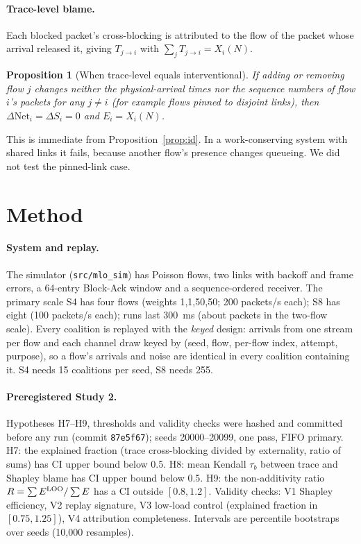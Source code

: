 \documentclass[11pt]{article}
\newtheorem{proposition}{Proposition}
\begin{document}
\paragraph{Trace-level blame.} Each blocked packet's cross-blocking is attributed to the flow of the packet whose arrival released it, giving $T_{j\to i}$ with $\sum_jT_{j\to i}=X_i(N)$.
\begin{proposition}[When trace-level equals interventional]\label{prop:cond}
If adding or removing flow $j$ changes neither the physical-arrival times nor the sequence numbers of flow $i$'s packets for any $j\neq i$ (for example flows pinned to disjoint links), then $\Delta\mathrm{Net}_i=\Delta S_i=0$ and $E_i=X_i(N)$.
\end{proposition}
This is immediate from Proposition~\ref{prop:id}. In a work-conserving system with shared links it fails, because another flow's presence changes queueing. We did not test the pinned-link case.

\section{Method}
\paragraph{System and replay.} The simulator (\texttt{src/mlo\_sim}) has Poisson flows, two links with backoff and frame errors, a 64-entry Block-Ack window and a sequence-ordered receiver. The primary scale S4 has four flows (weights 1,1,50,50; 200 packets/s each); S8 has eight (100 packets/s each); runs last 300~ms (about \GenPerRun{} packets in the two-flow scale). Every coalition is replayed with the \emph{keyed} design: arrivals from one stream per flow and each channel draw keyed by (seed, flow, per-flow index, attempt, purpose), so a flow's arrivals and noise are identical in every coalition containing it. S4 needs 15 coalitions per seed, S8 needs 255.

\paragraph{Preregistered Study 2.} Hypotheses H7--H9, thresholds and validity checks were hashed and committed before any run (commit \texttt{87e5f67}); seeds 20000--20099, one pass, FIFO primary. H7: the explained fraction (trace cross-blocking divided by externality, ratio of sums) has CI upper bound below 0.5. H8: mean Kendall $\tau_b$ between trace and Shapley blame has CI upper bound below 0.5. H9: the non-additivity ratio $R=\sum E^{\rm LOO}/\sum E$ has a CI outside $[0.8,1.2]$. Validity checks: V1 Shapley efficiency, V2 replay signature, V3 low-load control (explained fraction in $[0.75,1.25]$), V4 attribution completeness. Intervals are percentile bootstraps over seeds (10{,}000 resamples).
\end{document}
